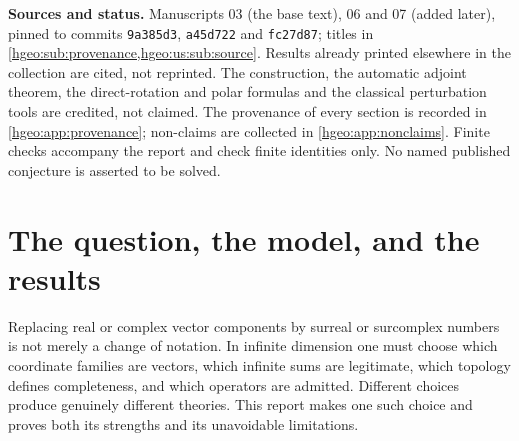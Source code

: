 \documentclass[11pt,letterpaper]{article}
\numberwithin{equation}{section}
\theoremstyle{definition}
\theoremstyle{remark}
\begin{document}
\begin{titlepage}
\begin{minipage}{.96\textwidth}
\begin{abstract}
A positive counterpart: every positive-order Hahn perturbation of an
ordinary Fredholm operator has an adjointable Moore--Penrose inverse, and a
finite Schur matrix determines its kernel, cokernel, index and exact inverse
valuation. Adjointable operators on the class of all surcomplex vectors have
one set-sized support.

This report is built from three manuscripts; it says which source proved
each result, prints shared results once, and keeps every source's
limitations. It is an AI-assisted draft: it has not been refereed,
and nothing in it has been formalized in Lean.
\end{abstract}
\end{minipage}
\vfill
\begin{minipage}{.96\textwidth}\small
\textbf{Sources and status.} Manuscripts 03 (the base text), 06 and 07
(added later), pinned to commits \texttt{9a385d3}, \texttt{a45d722} and
\texttt{fc27d87}; titles in \cref{hgeo:sub:provenance,hgeo:us:sub:source}. Results
already printed elsewhere in the collection are cited, not reprinted. The
construction, the automatic adjoint theorem, the direct-rotation and polar
formulas and the classical perturbation tools are credited, not claimed. The provenance of
every section is recorded in \cref{hgeo:app:provenance}; non-claims are
collected in \cref{hgeo:app:nonclaims}. Finite checks accompany the report
and check finite identities only. No named published conjecture is asserted
to be solved.
\end{minipage}
\end{titlepage}
\hypersetup{pageanchor=true}
\setcounter{tocdepth}{2}
\tableofcontents
\clearpage
{}

\section{The question, the model, and the results}
\label{hgeo:sec:intro}

Replacing real or complex vector components by surreal or surcomplex
numbers is not merely a change of notation. In infinite dimension one
must choose which coordinate families are vectors, which infinite sums
are legitimate, which topology defines completeness, and which operators
are admitted. Different choices produce genuinely different theories. This
report makes one such choice and proves both its strengths and its
unavoidable limitations.
\end{document}
